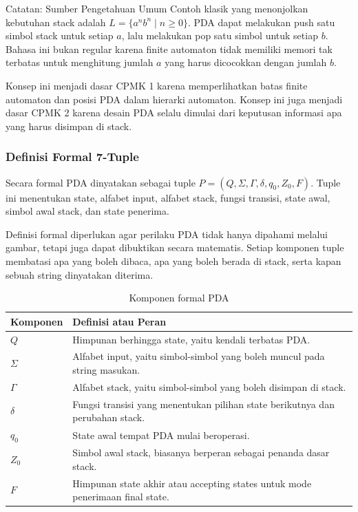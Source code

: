 \begin{cmt}{Catatan: Sumber Pengetahuan Umum}{}
Contoh klasik yang menonjolkan kebutuhan stack adalah $L=\{a^n b^n \mid n \geq 0\}$. PDA dapat melakukan push satu simbol stack untuk setiap $a$, lalu melakukan pop satu simbol untuk setiap $b$. Bahasa ini bukan regular karena finite automaton tidak memiliki memori tak terbatas untuk menghitung jumlah $a$ yang harus dicocokkan dengan jumlah $b$.
\end{cmt}

Konsep ini menjadi dasar CPMK 1 karena memperlihatkan batas finite automaton dan posisi PDA dalam hierarki automaton. Konsep ini juga menjadi dasar CPMK 2 karena desain PDA selalu dimulai dari keputusan informasi apa yang harus disimpan di stack.

\subsubsection{Definisi Formal 7-Tuple}

\begin{jawab}
Secara formal PDA dinyatakan sebagai tuple $P=(Q,\Sigma,\Gamma,\delta,q_0,Z_0,F)$. Tuple ini menentukan state, alfabet input, alfabet stack, fungsi transisi, state awal, simbol awal stack, dan state penerima.
\end{jawab}

Definisi formal diperlukan agar perilaku PDA tidak hanya dipahami melalui gambar, tetapi juga dapat dibuktikan secara matematis. Setiap komponen tuple membatasi apa yang boleh dibaca, apa yang boleh berada di stack, serta kapan sebuah string dinyatakan diterima.

\begin{table}[H]
\centering
\begin{tabularx}{\textwidth}{|L{0.20\textwidth}|X|}
\hline
\textbf{Komponen} & \textbf{Definisi atau Peran} \\
\hline
$Q$ & Himpunan berhingga state, yaitu kendali terbatas PDA. \\
\hline
$\Sigma$ & Alfabet input, yaitu simbol-simbol yang boleh muncul pada string masukan. \\
\hline
$\Gamma$ & Alfabet stack, yaitu simbol-simbol yang boleh disimpan di stack. \\
\hline
$\delta$ & Fungsi transisi yang menentukan pilihan state berikutnya dan perubahan stack. \\
\hline
$q_0$ & State awal tempat PDA mulai beroperasi. \\
\hline
$Z_0$ & Simbol awal stack, biasanya berperan sebagai penanda dasar stack. \\
\hline
$F$ & Himpunan state akhir atau accepting states untuk mode penerimaan final state. \\
\hline
\end{tabularx}
\caption{Komponen formal PDA}
\label{tab:komponen-pda}
\end{table}

